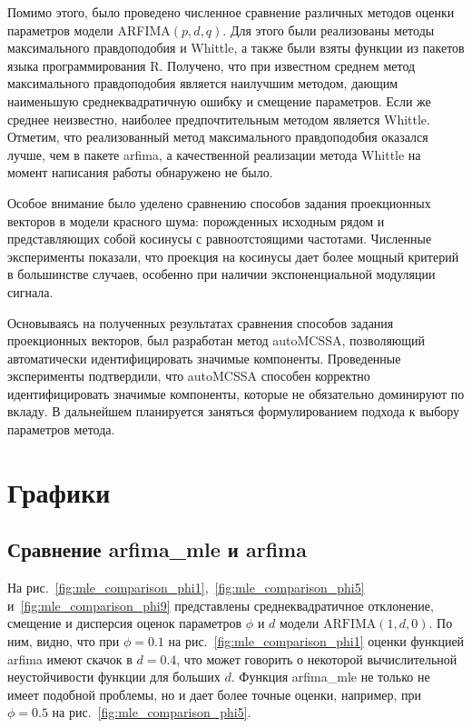 \documentclass[specialist,
substylefile = spbu_report.rtx,
subf,href,colorlinks=true, 12pt]{disser}
\theoremstyle{definition}
\begin{document}
Помимо этого, было проведено численное сравнение различных методов оценки параметров модели ARFIMA$(p, d, q)$. Для этого были реализованы методы максимального правдоподобия и Whittle, а также были взяты функции из пакетов языка программирования \textsf{R}. Получено, что при известном среднем метод максимального правдоподобия является наилучшим методом, дающим наименьшую среднеквадратичную ошибку и смещение параметров. Если же среднее неизвестно, наиболее предпочтительным методом является Whittle. Отметим, что реализованный метод максимального правдоподобия оказался лучше, чем в пакете \textsf{arfima}, а качественной реализации метода Whittle на момент написания работы обнаружено не было.

Особое внимание было уделено сравнению способов задания проекционных векторов в модели красного шума: порожденных исходным рядом и представляющих собой косинусы с равноотстоящими частотами. Численные эксперименты показали, что проекция на косинусы дает более мощный критерий в большинстве случаев, особенно при наличии экспоненциальной модуляции сигнала.

Основываясь на полученных результатах сравнения способов задания проекционных векторов, был разработан метод autoMCSSA, позволяющий автоматически идентифицировать значимые компоненты. Проведенные эксперименты подтвердили, что autoMCSSA способен корректно идентифицировать значимые компоненты, которые не обязательно доминируют по вкладу. В дальнейшем планируется заняться формулированием подхода к выбору параметров метода.




\appendix

\chapter{Графики}

\section{Сравнение \textsf{arfima\_mle} и \textsf{arfima}}\label{sect:mle_comparison}

На рис.~\ref{fig:mle_comparison_phi1},~\ref{fig:mle_comparison_phi5} и~\ref{fig:mle_comparison_phi9} представлены среднеквадратичное отклонение, смещение и дисперсия оценок параметров $\phi$ и $d$ модели $\mathrm{ARFIMA}(1, d, 0)$. По ним, видно, что при $\phi=0.1$ на рис.~\ref{fig:mle_comparison_phi1} оценки функцией \textsf{arfima} имеют скачок в $d=0.4$, что может говорить о некоторой вычислительной неустойчивости функции для больших $d$. Функция \textsf{arfima\_mle} не только не имеет подобной проблемы, но и дает более точные оценки, например, при $\phi=0.5$ на рис.~\ref{fig:mle_comparison_phi5}.
\end{document}
